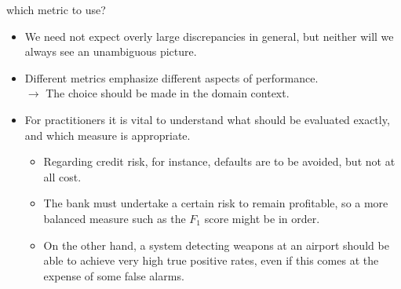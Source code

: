 \documentclass[11pt,compress,t,notes=noshow, xcolor=table]{beamer}
\begin{document}
\begin{vbframe}{which metric to use?}
\begin{itemize}
  \item We need not expect overly large discrepancies in general, but neither
  will we always see an unambiguous picture.
  \item Different metrics emphasize different aspects of performance. \\
  $\rightarrow$ The choice should be made in the domain context.
  \item For practitioners it is vital to understand what should be
  evaluated exactly, and which measure is appropriate.
  \begin{itemize}
    \item Regarding credit risk, for instance, defaults are to be avoided, but
    not at all cost.
    \item The bank must undertake a certain risk to remain profitable, so a more
    balanced measure such as the $F_1$ score might be in order.
    \item On the other hand, a system detecting weapons at an airport should be
    able to achieve very high true positive rates, even if this comes at the
    expense of some false alarms.
  \end{itemize}
\end{itemize}

\end{vbframe}


\endlecture
\end{document}
